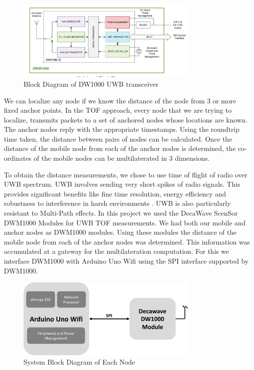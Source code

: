 \documentclass[journal,transmag]{IEEEtran}
\begin{document}
\begin{figure}[!t]
\centering
\includegraphics[width=3.5in]{dw1000bd}
\caption{{Block Diagram of DW1000 UWB transceiver}}
\label{DW1000BD}
\end{figure}

We can localize any node if we know the distance of the node from 3 or more fixed anchor points. In the TOF approach, every node that we are trying to localize, transmits packets to a set of anchored nodes whose locations are known. The anchor nodes reply with the appropriate timestamps. Using the roundtrip time taken, the distance between pairs of nodes can be calculated. Once the distance of the mobile node from each of the anchor nodes is determined, the co-ordinates of the mobile nodes can be multilaterated in 3 dimensions.

To obtain the distance measurements, we chose to use time of flight of radio over UWB spectrum. UWB involves sending very short spikes of radio signals. This provides significant benefits like fine time resolution, energy efficiency and robustness to interference in harsh environments \cite{uwb}. UWB is also particularly resistant to Multi-Path effects. In this project we used the DecaWave ScenSor DWM1000 Modules for UWB TOF measurements. We had both our mobile and anchor nodes as DWM1000 modules. Using these modules the distance of the mobile node from each of the anchor nodes was determined.  This information was accumulated at a gateway for the multilateration computation. For this we interface DWM1000 with Arduino Uno Wifi using the SPI interface supported by DWM1000.

\begin{figure}[!t]
\centering
\includegraphics[width=3.5in]{nodebd.png}
\caption{{System Block Diagram of Each Node}}
\label{EACHNODEBD}
\end{figure}
\end{document}
